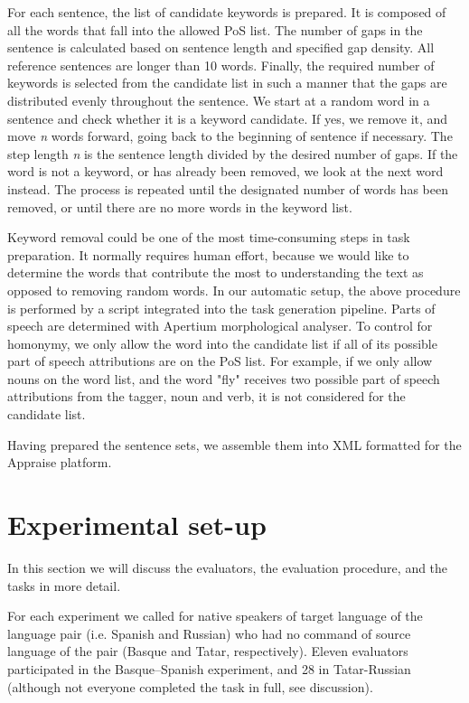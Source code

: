 \documentclass[11pt]{article}
\newcommand{\comment}[1]{\marginpar{\scriptsize\sf \textcolor{blue}{#1}}}
\begin{document}
For each sentence, the list of candidate keywords is prepared. It is composed of all the words that 
fall into the allowed PoS list. The number of gaps in the sentence is calculated based on 
sentence length and specified gap density. All reference sentences are longer than 10 words. Finally, the required number of keywords is selected 
from the candidate list in such a manner that the gaps are distributed evenly throughout the sentence. We start at a random word in a sentence and check whether it is a keyword candidate. If yes, we remove it, and move \emph{n} words forward, going back to the beginning of sentence if necessary. The step length \emph{n} is the sentence length divided by the desired number of gaps. If the word is not a keyword, or has already been removed, we look at the next word instead. The process is repeated until the designated number of words has been removed, or until there are no more words in the keyword list.

Keyword removal could be one of the most time-consuming steps in task preparation. It normally requires human effort, because we would like to determine the words that contribute the most to understanding the text as opposed to removing random words. In our automatic setup, the above procedure is performed by a script integrated into the task generation pipeline. Parts of speech are determined with Apertium morphological analyser. To control for homonymy, we only allow the word into the candidate list if all of its possible part of speech attributions are on the PoS list. For example, if we only allow nouns on the word list, and the word "fly" receives two possible part of speech attributions from the tagger, noun and verb, it is not considered for the candidate list.

Having prepared the sentence sets, we assemble them into XML formatted for the Appraise platform.

\section{Experimental set-up}
\label{sec:setup}

In this section we will discuss the evaluators, the evaluation procedure, and the tasks in more detail.

For each experiment we called for native speakers of target language of the language pair (i.e.
Spanish and Russian) who had no command of source language of the pair (Basque
and Tatar, respectively). Eleven evaluators participated in the Basque--Spanish experiment, and 28 in Tatar-Russian (although not everyone completed the task
in full, see discussion).
\end{document}
